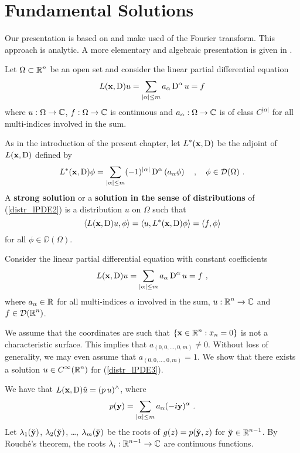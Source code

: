 \section{Fundamental Solutions}

Our presentation is based on \cite{FoPDE} and make used of the Fourier
transform.  This approach is analytic.  A more elementary and algebraic
presentation is given in \cite{Smo}.

Let $\displaystyle \Omega \subset \mathbb{R}^n$ be an open set and consider
the linear partial differential equation
\begin{equation} \label{distr_lPDE2}
L(\mathbf{x},\operatorname{D})u = \sum_{|\alpha|\leq m} a_\alpha \operatorname{D}^\alpha u = f
\end{equation}
where $u:\Omega \rightarrow \mathbb{C}$, $f:\Omega \rightarrow \mathbb{C}$ is
continuous and $a_\alpha:\Omega \rightarrow \mathbb{C}$ is of class
$\displaystyle C^{|\alpha|}$ for all multi-indices involved in the sum.

As in the introduction of the present chapter, let
$\displaystyle L^\ast(\mathbf{x}, \operatorname{D})$ 
be the adjoint of $L(\mathbf{x}, \operatorname{D})$ defined by
\[
L^\ast(\mathbf{x},\operatorname{D})\phi = \sum_{|\alpha|\leq m} (-1)^{|\alpha|}
\operatorname{D}^\alpha \left(a_\alpha \phi \right) \quad , \quad \phi \in
\mathcal{D}(\Omega) \ .
\]
A {\bfseries strong solution} or a
{\bfseries solution in the sense of distributions}
of (\ref{distr_lPDE2}) is a distribution $u$ on $\Omega$ such that
\[
\left\langle{L(\mathbf{x},\operatorname{D})u} , {\phi}\right\rangle = \left\langle{u} , {L^\ast(\mathbf{x},\operatorname{D})\phi}\right\rangle =
\left\langle{f} , {\phi}\right\rangle
\]
for all $\phi \in \DD(\Omega)$.

Consider the linear partial differential equation with constant coefficients
\begin{equation} \label{distr_lPDE3}
L(\mathbf{x},\operatorname{D})u = \sum_{|\alpha|\leq m} a_\alpha \operatorname{D}^\alpha u = f \  ,
\end{equation}
where $a_\alpha \in \mathbb{R}$ for all multi-indices $\alpha$ involved in the
sum, $\displaystyle u:\mathbb{R}^n \rightarrow \mathbb{C}$ and
$\displaystyle f \in \mathcal{D}(\mathbb{R}^n)$.

We assume that the coordinates are such that
$\displaystyle \{ \mathbf{x} \in \mathbb{R}^n : x_n=0 \}$ is not a characteristic surface.
This implies that $a_{(0,0,\ldots,0,m)} \neq 0$.  Without loss of
generality, we may even assume that $a_{(0,0,\ldots,0,m)} = 1$.
We show that there exists a solution $\displaystyle u \in C^\infty(\mathbb{R}^n)$ for
(\ref{distr_lPDE3}).

We have that $\displaystyle L(\mathbf{x},\operatorname{D})\hat{u} = (p\, u)^\wedge$, where
\begin{equation} \label{distr_lPDE3_ex1}
p(\VEC{y}) = \sum_{|\alpha|\leq m} a_\alpha (-i\VEC{y})^\alpha \ .
\end{equation}
Let $\lambda_1(\breve{\mathbf{y}})$, $\lambda_2(\breve{\mathbf{y}})$, \ldots,
$\lambda_m(\breve{\mathbf{y}})$ be the roots of
$\displaystyle g(z) = p(\breve{\mathbf{y}}, z)$ for
$\displaystyle \breve{\mathbf{y}}\in \mathbb{R}^{n-1}$.
By Rouch\'e's theorem, the roots
$\displaystyle \lambda_i:\mathbb{R}^{n-1} \rightarrow \mathbb{C}$
are continuous functions.

